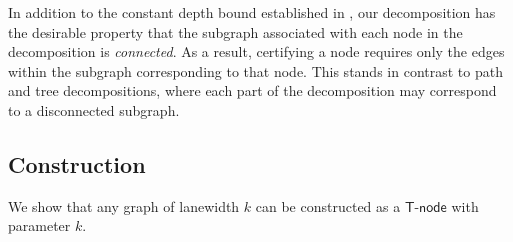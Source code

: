 \documentclass[11pt]{article}
\theoremstyle{definition}
\theoremstyle{remark}
\newcommand{\tnode}{\mathsf{T}\text{-}\mathsf{node}}
\begin{document}
In addition to the constant depth bound established in , our decomposition has the desirable property that the subgraph associated with each node in the decomposition is \emph{connected}. As a result, certifying a node requires only the edges within the subgraph corresponding to that node. This stands in contrast to path and tree decompositions, where each part of the decomposition may correspond to a disconnected subgraph.


\subsection{Construction}\label{sect:recursive_construct}

We show that any graph of lanewidth $k$ can be constructed as a $\tnode$ with parameter $k$.
\end{document}
